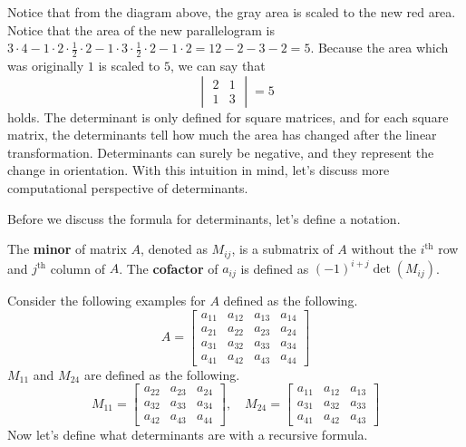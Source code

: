 \documentclass[../../main.tex]{subfiles}
\begin{document}
Notice that from the diagram above, the gray area is scaled to the
new red area. Notice that the area of the new parallelogram is
$3 \cdot 4 - 1 \cdot 2 \cdot \frac{1}{2} \cdot 2 - 1 \cdot 3 \cdot
\frac{1}{2} \cdot 2 - 1 \cdot 2 = 12 - 2 - 3 - 2 = 5$. Because
the area which was originally $1$ is scaled to $5$, we can say that
\[
\begin{vmatrix}
    2 & 1 \\
    1 & 3
\end{vmatrix}
= 5
\]
holds. The determinant is only defined for square matrices, and for
each square matrix, the determinants tell how much the area has
changed after the linear transformation. Determinants can surely
be negative, and they represent the change in orientation.
With this intuition in mind, let's discuss more computational
perspective of determinants.

Before we discuss the formula for determinants, let's define a
notation.

\begin{definition}{}{}
The \textbf{minor} of matrix $A$, denoted as $M_{ij}$, is a submatrix
of $A$ without the $i^\text{th}$ row and $j^\text{th}$ column of $A$.
The \textbf{cofactor} of $a_{ij}$ is defined as $(-1)^{i+j}
\det(M_{ij})$.
\end{definition}

Consider the following examples for $A$ defined as the following.
\[
A =
\begin{bmatrix}
    a_{11} & a_{12} & a_{13} & a_{14} \\
    a_{21} & a_{22} & a_{23} & a_{24} \\
    a_{31} & a_{32} & a_{33} & a_{34} \\
    a_{41} & a_{42} & a_{43} & a_{44}
\end{bmatrix}
\]
$M_{11}$ and $M_{24}$ are defined as the following.
\[
M_{11} =
\begin{bmatrix}
    a_{22} & a_{23} & a_{24} \\
    a_{32} & a_{33} & a_{34} \\
    a_{42} & a_{43} & a_{44}
\end{bmatrix}, \quad
M_{24} =
\begin{bmatrix}
    a_{11} & a_{12} & a_{13} \\
    a_{31} & a_{32} & a_{33} \\
    a_{41} & a_{42} & a_{43}
\end{bmatrix}
\]
Now let's define what determinants are with a recursive formula.
\end{document}
